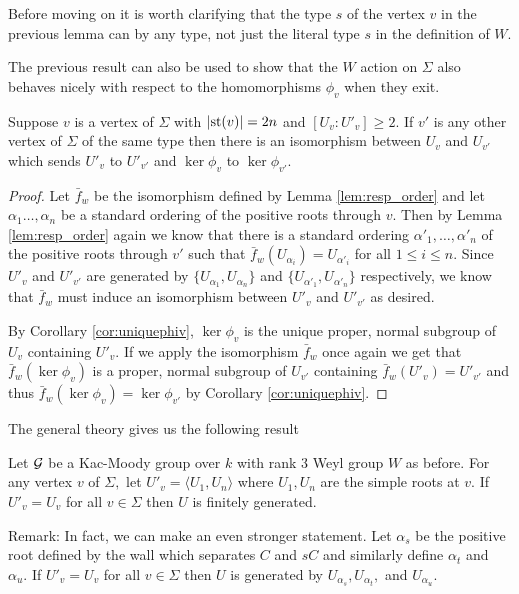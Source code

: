 \documentclass[class=book, crop=false,12 pt]{standalone}
\begin{document}
Before moving on it is worth clarifying that the type $s$ of the vertex $v$ in the previous lemma can by any type, not just the literal type $s$ in the definition of $W.$

The previous result can also be used to show that the $W$ action on $\Sigma$ also behaves nicely with respect to the homomorphisms $\phi_v$ when they exit.
\begin{cor}
	\label{cor:respect_phiv}
	Suppose $v$ is a vertex of $\Sigma$ with $|\mathrm{st}(v)|=2n$ and $[U_v:U'_v]\ge 2.$ If $v'$ is any other vertex of $\Sigma$ of the same type then there is an isomorphism between $U_v$ and $U_{v'}$ which sends $U'_v$ to $U'_{v'}$ and $\ker \phi_v$ to $\ker \phi_{v'}.$
\end{cor}
\begin{proof}
	Let $\bar{f}_w$ be the isomorphism defined by Lemma \ref{lem:resp_order} and let $\alpha_1\dots,\alpha_n$ be a standard ordering of the positive roots through $v.$ Then by Lemma \ref{lem:resp_order} again we know that there is a standard ordering $\alpha'_1,\dots,\alpha'_n$ of the positive roots through $v'$ such that $\bar{f}_w(U_{\alpha_i})=U_{\alpha'_i}$ for all $1\le i\le n.$ Since $U'_v$ and $U'_{v'}$ are generated by $\{U_{\alpha_1},U_{\alpha_n}\}$ and $\{U_{\alpha'_1},U_{\alpha'_n}\}$ respectively, we know that $\bar{f}_w$ must induce an isomorphism between $U'_v$ and $U'_{v'}$ as desired.

	By Corollary \ref{cor:uniquephiv}, $\ker \phi_v$ is the unique proper, normal subgroup of $U_v$ containing $U'_v.$ If we apply the isomorphism $\bar{f}_w$ once again we get that $\bar{f}_w(\ker \phi_v)$ is a proper, normal subgroup of $U_{v'}$ containing $\bar{f}_w(U'_v)=U'_{v'}$ and thus $\bar{f}_w(\ker \phi_v)=\ker \phi_{v'}$ by Corollary \ref{cor:uniquephiv}.
\end{proof}



\vspace{1 in}
The general theory gives us the following result
\begin{theorem}
	\label{knownfgresult}
	Let $\mathcal{G}$ be a Kac-Moody group over $k$ with rank 3 Weyl group $W$ as before. For any vertex $v$ of $\Sigma,$ let $U'_v=\langle U_1,U_n\rangle$ where $U_1,U_n$ are the simple roots at $v.$ If $U'_v=U_v$ for all $v\in \Sigma$ then $U$ is finitely generated.
\end{theorem}

Remark: In fact, we can make an even stronger statement. Let $\alpha_s$ be the positive root defined by the wall which separates $C$ and $sC$ and similarly define  $\alpha_t$ and $\alpha_u.$ If $U'_v=U_v$ for all $v\in \Sigma$ then $U$ is generated by $ U_{\alpha_s}, U_{\alpha_t},$ and  $U_{\alpha_u}.$
\end{document}
